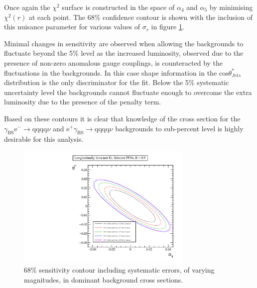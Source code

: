 Once again the $\chi^{2}$ surface is constructed in the space of $\alpha_{4}$ and $\alpha_{5}$ by minimising $\chi^{2}(r)$ at each point.  The 68\% confidence contour is shown with the inclusion of this nuisance parameter for various values of $\sigma_{r}$ in figure \ref{fig:nuisance1400GeV}.   

Minimal changes in sensitivity are observed when allowing the backgrounds to fluctuate beyond the 5\% level as the increased luminosity, observed due to the presence of non-zero anomalous gauge couplings, is counteracted by the fluctuations in the backgrounds.  In this case shape information in the $\text{cos}\theta^{*}_{Jets}$ distribution is the only discriminator for the fit.  Below the 5\% systematic uncertainty level the backgrounds cannot fluctuate enough to overcome the extra luminosity due to the presence of the penalty term. 

Based on these contours it is clear that knowledge of the cross section for the $\gamma_{\text{BS}}\text{e}^{-} \rightarrow \text{qqqq}\nu$ and $\text{e}^{+}\gamma_{\text{BS}} \rightarrow \text{qqqq}\nu$ backgrounds to sub-percent level is highly desirable for this analysis.  

\begin{figure}
\centering
\includegraphics[width=0.75\textwidth]{PhysicsAnalysis/Plots/NuisanceFit/1400GeV/Nuisance.pdf}
\caption[68\% sensitivity contour including systematic errors, of varying magnitudes, in dominant background cross sections.]{68\% sensitivity contour including systematic errors, of varying magnitudes, in dominant background cross sections.}
\label{fig:nuisance1400GeV}
\end{figure}


